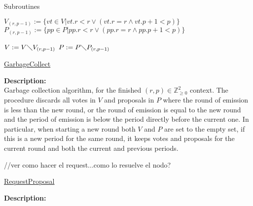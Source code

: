 \documentclass[10pt,a4paper]{article}
\begin{document}
\begin{section}{Subroutines}

\begin{algorithm}[H]\label{algo:garbage-collect}
    \begin{algorithmic}[1]

    \State $V_{(r,p-1)} := \{ vt \in V | vt.r < r \lor (vt.r=r \land vt.p + 1 < p) \}$
    \State $P_{(r,p-1)} := \{ pp \in P | pp.r < r \lor (pp.r=r \land pp.p + 1 < p) \}$

    \State $V := V\diagdown V_{(r,p-1)}$
    \State $P := P\diagdown P_{(r,p-1)}$

    \EndFunction
    \end{algorithmic}
    \caption{\underline{GarbageCollect}}
\end{algorithm}

\noindent \textbf{Description:}\\
Garbage collection algorithm, for the finished $(r,p)\in\mathbb{Z}_{\ge 0}^2$ context.
The procedure discards all votes in $V$ and proposals in $P$ where the round of emission is less than the
new round, or the round of emission is equal to the new round and the period of emission is below the period
directly before the current one.
In particular, when starting a new round both $V$ and $P$ are set to the empty set,
if this is a new period for the same round, it keeps votes and proposals for the current round
and both the current and previous periods.


\begin{algorithm}[H]\label{algo:request-proposal}
    \begin{algorithmic}[1]
        //ver como hacer el request...como lo resuelve el nodo?
    \EndFunction
    \end{algorithmic}
    \caption{\underline{RequestProposal}}
\end{algorithm}

\noindent \textbf{Description:}\\



\end{section}
\end{document}
